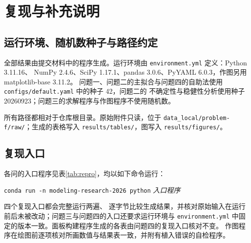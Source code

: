 \appendix
\renewcommand{\theHsection}{appendix.\Alph{section}}
\renewcommand{\theHsubsection}{appendix.\Alph{section}.\arabic{subsection}}
\renewcommand{\theHtable}{appendix.\Alph{section}.\arabic{table}}
\renewcommand{\theHfigure}{appendix.\Alph{section}.\arabic{figure}}
\renewcommand{\theHequation}{appendix.\Alph{section}.\arabic{equation}}
\section{复现与补充说明}
\renewcommand{\thesubsection}{\Alph{section}.\arabic{subsection}}
\renewcommand{\thetable}{\Alph{section}.\arabic{table}}
\renewcommand{\thefigure}{\Alph{section}.\arabic{figure}}
\renewcommand{\theequation}{\Alph{section}.\arabic{equation}}
\setcounter{table}{0}
\setcounter{figure}{0}
\setcounter{equation}{0}

\subsection{运行环境、随机数种子与路径约定}

全部结果由提交材料中的程序生成。运行环境由 \texttt{environment.yml} 定义：Python 3.11.16、
NumPy 2.4.6、SciPy 1.17.1、pandas 3.0.6、PyYAML 6.0.3，作图另用 matplotlib-base 3.11.2。
问题一、问题二的主拟合与问题四的自助法使用 \texttt{configs/default.yaml} 中的种子 42，问题二的
不确定性与稳健性分析使用种子 20260923；问题三的求解程序与作图程序不使用随机数。

所有路径都相对于仓库根目录。原始附件只读，位于
\texttt{data\_local/\allowbreak problem-f/\allowbreak raw/}；生成的表格写入
\texttt{results/\allowbreak tables/}，图写入 \texttt{results/\allowbreak figures/}。

\subsection{复现入口}

各问的入口程序见表\ref{tab:repro}，均以如下命令运行：
\begin{center}
  \texttt{conda run -n modeling-research-2026 python} \textit{入口程序}
\end{center}
四个复现入口都会完整运行两遍、
逐字节比较生成结果，并核对原始输入在运行前后未被改动；问题三与问题四的入口还要求运行环境与
\texttt{environment.yml} 中固定的版本一致。面板构建程序生成的各表由问题四的复现入口核对不变。
作图程序在绘图前逐项核对所画数值与结果表一致，并附有植入错误的自检程序。

